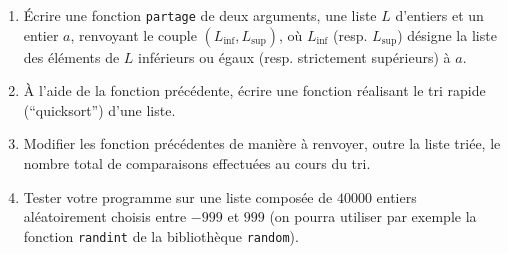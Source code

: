 \begin{exercice}
\begin{enumerate} 
\item \'Ecrire une fonction \texttt{partage} de deux arguments, une liste $L$ d'entiers et un entier $a$, renvoyant le couple $(L_{\inf},L_{\sup})$, où $L_{\inf}$ (resp. $L_{\sup}$) désigne la liste des éléments de $L$ inférieurs ou égaux (resp. strictement supérieurs) à $a$.
\item \`A l'aide de la fonction précédente, écrire une fonction réalisant le tri rapide (``quicksort'') d'une liste.
\item Modifier les fonction précédentes de manière à renvoyer, outre la liste triée, le nombre total de comparaisons effectuées au cours du tri.
\item Tester votre programme sur une liste composée de $40000$ entiers aléatoirement choisis entre $-999$ et $999$ (on pourra utiliser par exemple la fonction \texttt{randint} de la bibliothèque \texttt{random}).
\end{enumerate}
\end{exercice}



